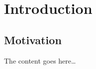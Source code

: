 \documentclass[a4paper,11pt,parskip=half,cleardoublepage=empty]{scrbook}
\begin{document}
    
    \cleardoublepage
    \tableofcontents 
    \cleardoublepage
    \pagestyle{plain} 

    \chapter{Introduction}
    \label{chp:introduction}

    \section{Motivation}
    \label{sec:introduction}

    The content goes here\ldots
    \cite{turing1937computable}

    
    
\end{document}
